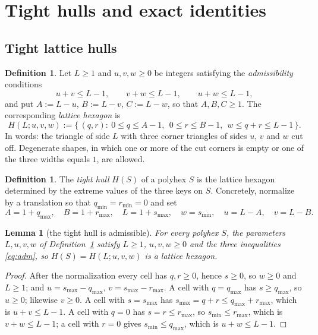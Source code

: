 \documentclass[11pt]{article}
\theoremstyle{plain}
\newtheorem{lemma}[theorem]{Lemma}
\theoremstyle{definition}
\newtheorem{definition}[theorem]{Definition}
\theoremstyle{remark}
\begin{document}
\section{Tight hulls and exact identities}\label{sec:hulls}

\subsection{Tight lattice hulls}\label{sec:2.4}

\begin{definition}\label{def:hexagon}
Let \(L\ge1\) and \(u,v,w\ge0\) be integers satisfying the \emph{admissibility} conditions
\begin{equation}\label{eq:adm}
   u+v\le L-1,\qquad v+w\le L-1,\qquad u+w\le L-1 ,
\end{equation}
and put \(A:=L-u\), \(B:=L-v\), \(C:=L-w\), so that \(A,B,C\ge1\). The corresponding
\emph{lattice hexagon} is
\[
   H(L;u,v,w):=\{\,(q,r):\ 0\le q\le A-1,\ \ 0\le r\le B-1,\ \ w\le q+r\le L-1\,\}.
\]
In words: the triangle of side \(L\) with three corner triangles of sides \(u\), \(v\) and
\(w\) cut off. Degenerate shapes, in which one or more of the cut corners is empty or one
of the three widths equals \(1\), are allowed.
\end{definition}

\begin{definition}\label{def:hull}
The \emph{tight hull} \(H(S)\) of a polyhex \(S\) is the lattice hexagon determined by the
extreme values of the three keys on \(S\). Concretely, normalize by a translation so that
\(q_{\min}=r_{\min}=0\) and set
\[
   A=1+q_{\max},\quad B=1+r_{\max},\quad L=1+s_{\max},\quad w=s_{\min},\quad
   u=L-A,\quad v=L-B .
\]
\end{definition}

\begin{lemma}[the tight hull is admissible]\label{lem:tightadm}
For every polyhex \(S\), the parameters \(L,u,v,w\) of Definition~\ref{def:hull} satisfy
\(L\ge1\), \(u,v,w\ge0\) and the three inequalities \eqref{eq:adm}, so
\(H(S)=H(L;u,v,w)\) is a lattice hexagon.
\end{lemma}

\begin{proof}
After the normalization every cell has \(q,r\ge0\), hence \(s\ge0\), so \(w\ge0\) and
\(L\ge1\); and \(u=s_{\max}-q_{\max}\), \(v=s_{\max}-r_{\max}\). A cell with
\(q=q_{\max}\) has \(s\ge q_{\max}\), so \(u\ge0\); likewise \(v\ge0\). A cell with
\(s=s_{\max}\) has \(s_{\max}=q+r\le q_{\max}+r_{\max}\), which is \(u+v\le L-1\). A cell
with \(q=0\) has \(s=r\le r_{\max}\), so \(s_{\min}\le r_{\max}\), which is \(v+w\le L-1\);
a cell with \(r=0\) gives \(s_{\min}\le q_{\max}\), which is \(u+w\le L-1\).
\end{proof}
\end{document}
